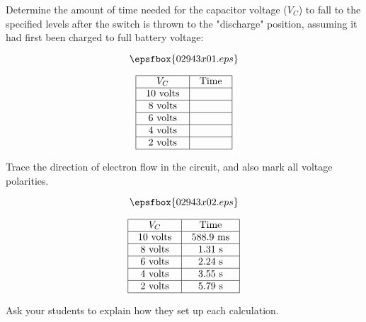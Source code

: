 

Determine the amount of time needed for the capacitor voltage ($V_C$) to fall to the specified levels after the switch is thrown to the "discharge" position, assuming it had first been charged to full battery voltage:

$$\epsfbox{02943x01.eps}$$


$$\vbox{\offinterlineskip
\halign{\strut
\vrule \quad\hfil # \ \hfil & 
\vrule \quad\hfil # \ \hfil \vrule \cr
\noalign{\hrule}
%
$V_C$ & Time  \cr
%
\noalign{\hrule}
%
10 volts &  \cr
%
\noalign{\hrule}
%
8 volts &  \cr
%
\noalign{\hrule}
%
6 volts &  \cr
%
\noalign{\hrule}
%
4 volts &  \cr
%
\noalign{\hrule}
%
2 volts &  \cr
%
\noalign{\hrule}
} %
}$$ %

Trace the direction of electron flow in the circuit, and also mark all voltage polarities.







$$\epsfbox{02943x02.eps}$$


$$\vbox{\offinterlineskip
\halign{\strut
\vrule \quad\hfil # \ \hfil & 
\vrule \quad\hfil # \ \hfil \vrule \cr
\noalign{\hrule}
%
$V_C$ & Time  \cr
%
\noalign{\hrule}
%
10 volts & 588.9 ms \cr
%
\noalign{\hrule}
%
8 volts & 1.31 s \cr
%
\noalign{\hrule}
%
6 volts & 2.24 s \cr
%
\noalign{\hrule}
%
4 volts & 3.55 s \cr
%
\noalign{\hrule}
%
2 volts & 5.79 s \cr
%
\noalign{\hrule}
} %
}$$ %







Ask your students to explain how they set up each calculation.




